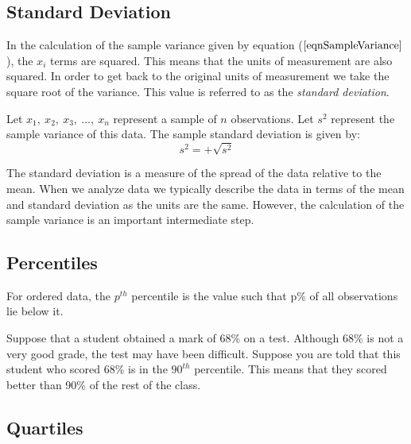\subsection{Standard Deviation}

In the calculation of the sample variance given by equation ($\ref{eqnSampleVariance}$), the $x_i$ terms are squared. This means that the units of measurement are also squared. In order to get back to the original units of measurement we take the 
square root of the variance. This value is referred to as the \textit{standard deviation}.

\begin{definition}	
Let $x_{1}, ~x_{2}, ~x_{3}, ~\ldots , ~x_{n}$ represent a sample of $n$ observations.
Let $s^{2}$ represent the sample variance of this data.
The sample standard deviation is given by:
	\begin{equation}
	s^{2} = + \sqrt{s^{2}}
	\end{equation}
\end{definition}

The standard deviation is a measure of the spread of the data relative to the mean. When we analyze data we typically describe the data in terms of the mean and standard deviation as the units are the same. However, the calculation of the sample variance is an important 
intermediate step.



\subsection{Percentiles}

\begin{definition}[Percentile]	
For ordered data, the $p^{th}$ percentile is the value such that p\% of all observations lie below it.
\end{definition}

Suppose that a student obtained a mark of 68\% on a test.
Although 68\% is not a very good grade, the test may have been difficult. Suppose you are told that this student who scored 68\% is in the $90^{th}$ percentile. This means that they scored better than 90\% of the rest of the class.

\subsection{Quartiles}


